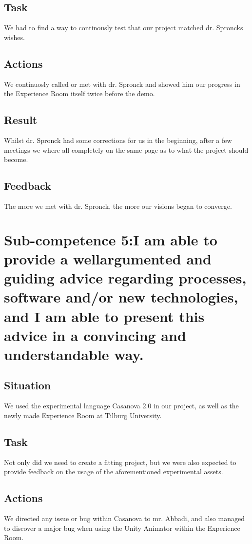 \documentclass[11pt]{article}
\begin{document}
\subsection{Task}
We had to find a way to continously test that our project matched dr. Sproncks wishes.
\subsection{Actions}
We continuosly called or met with dr. Spronck and showed him our progress in the Experience Room itself twice before the demo.
\subsection{Result}
Whilst dr. Spronck had some corrections for us in the beginning, after a few meetings we where all completely on the same page as to what the project should become.
\subsection{Feedback}
The more we met with dr. Spronck, the more our visions began to converge.

\newpage
\section{Sub-competence 5:I am able to provide a wellargumented
and guiding advice
regarding processes, software
and/or new technologies,
and I am able to present this
advice in a convincing and understandable
way.  } 
\subsection{Situation}
We used the experimental language Casanova 2.0 in our project, as well as the newly made Experience Room at Tilburg University.
\subsection{Task}
Not only did we need to create a fitting project, but we were also expected to provide feedback on the usage of the aforementioned experimental assets.
\subsection{Actions}
We directed any issue or bug within Casanova to mr. Abbadi, and also managed to discover a major bug when using the Unity Animator within the Experience Room. 
\end{document}
